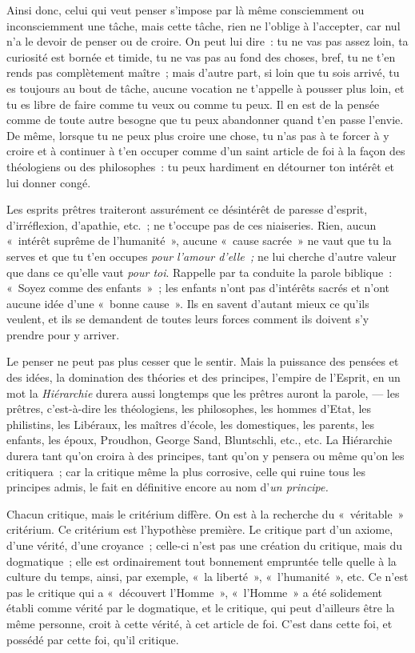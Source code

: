 \documentclass[french,twoside]{book} %
\begin{document}
Ainsi donc, celui qui veut penser s’impose par là même consciemment ou inconsciemment une tâche, mais cette tâche, rien ne l’oblige à l’accepter, car nul n’a le devoir de penser ou de croire. On peut lui dire : tu ne vas pas assez loin, ta curiosité est bornée et timide, tu ne vas pas au fond des choses, bref, tu ne t’en rends pas complètement maître ; mais d’autre part, si loin que tu sois arrivé, tu es toujours au bout de tâche, aucune vocation ne t’appelle à pousser plus loin, et tu es libre de faire comme tu veux ou comme tu peux. Il en est de la pensée comme de toute autre besogne que tu peux abandonner quand t’en passe l’envie. De même, lorsque tu ne peux plus croire une chose, tu n’as pas à te forcer à y croire et à continuer à t’en occuper comme d’un saint article de foi à la façon des théologiens ou des philosophes : tu peux hardiment en détourner ton intérêt et lui donner congé.\par
Les esprits prêtres traiteront assurément ce désintérêt de paresse d’esprit, d’irréflexion, d’apathie, etc. ; ne t’occupe pas de ces niaiseries. Rien, aucun « intérêt suprême de l’humanité », aucune « cause sacrée » ne vaut que tu la serves et que tu t’en occupes \emph{pour l’amour d’elle ;} ne lui cherche d’autre valeur que dans ce qu’elle vaut \emph{pour toi}. Rappelle par ta conduite la parole biblique : « Soyez comme des enfants » ; les enfants n’ont pas d’intérêts sacrés et n’ont aucune idée d’une « bonne cause ». Ils en savent d’autant mieux ce qu’ils veulent, et ils se demandent de toutes leurs forces comment ils doivent s’y prendre pour y arriver.\par
 Le penser ne peut pas plus cesser que le sentir. Mais la puissance des pensées et des idées, la domination des théories et des principes, l’empire de l’Esprit, en un mot la \emph{Hiérarchie} durera aussi longtemps que les prêtres auront la parole, — les prêtres, c’est-à-dire les théologiens, les philosophes, les hommes d’Etat, les philistins, les Libéraux, les maîtres d’école, les domestiques, les parents, les enfants, les époux, Proudhon, George Sand, Bluntschli, etc., etc. La Hiérarchie durera tant qu’on croira à des principes, tant qu’on y pensera ou même qu’on les critiquera ; car la critique même la plus corrosive, celle qui ruine tous les principes admis, le fait en définitive encore au nom d’\emph{un principe.}\par
Chacun critique, mais le critérium diffère. On est à la recherche du « véritable » critérium. Ce critérium est l’hypothèse première. Le critique part d’un axiome, d’une vérité, d’une croyance ; celle-ci n’est pas une création du critique, mais du dogmatique ; elle est ordinairement tout bonnement empruntée telle quelle à la culture du temps, ainsi, par exemple, « la liberté », « l’humanité », etc. Ce n’est pas le critique qui a « découvert l’Homme », « l’Homme » a été solidement établi comme vérité par le dogmatique, et le critique, qui peut d’ailleurs être la même personne, croit à cette vérité, à cet article de foi. C’est dans cette foi, et possédé par cette foi, qu’il critique.\par
\end{document}
